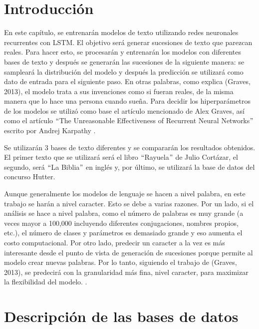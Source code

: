\section{Introducción}
En este capítulo, se entrenarán modelos de texto utilizando redes neuronales recurrentes con LSTM. El objetivo será generar sucesiones de texto que parezcan reales. Para hacer esto, se procesarán y entrenarán los modelos con diferentes bases de texto y después se generarán las sucesiones de la siguiente manera: se sampleará la distribución del modelo y después la predicción se utilizará como dato de entrada para el siguiente paso. En otras palabras, como explica (Graves, 2013), el modelo trata a sus invenciones como si fueran reales, de la misma manera que lo hace una persona cuando sueña. Para decidir los hiperparámetros de los modelos se utilizó como base el artículo mencionado de Alex Graves, así como el artículo $``$The Unreasonable Effectiveness of Recurrent Neural Networks$"$ escrito por Andrej Karpathy \cite{DBLP:journals/corr/Graves13} \cite{unreasonable}.

\vspace{1em}

Se utilizarán 3 bases de texto diferentes y se compararán los resultados obtenidos. El primer texto que se utilizará será el libro $``$Rayuela$"$ de Julio Cortázar, el segundo, será $``$La Biblia$"$ en inglés y, por último, se utilizará la base de datos del concurso Hutter.

\vspace{1em}

Aunque generalmente los modelos de lenguaje se hacen a nivel palabra, en este trabajo se harán a nivel caracter. Esto se debe a varias razones. Por un lado, si el análisis se hace a nivel palabra, como el número de palabras es muy grande (a veces mayor a 100,000 incluyendo diferentes conjugaciones, nombres propios, etc.), el número de clases y parámetros es demasiado grande y eso aumenta el costo computacional. Por otro lado, predecir un caracter a la vez es más interesante desde el punto de vista de generación de sucesiones porque permite al modelo crear nuevas palabras. Por lo tanto, siguiendo el trabajo de (Graves, 2013), se predecirá con la granularidad más fina, nivel caracter, para maximizar la flexibilidad del modelo. \cite{DBLP:journals/corr/Graves13}.

\section{Descripción de las bases de datos}

